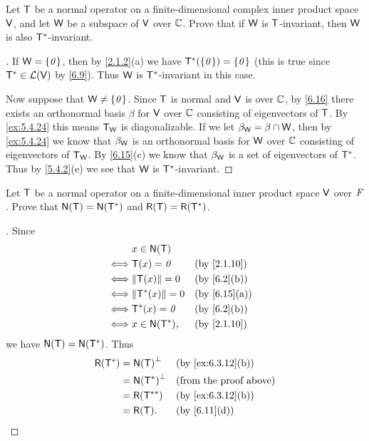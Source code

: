 \begin{ex}\label{ex:6.4.8}
  Let \(\mathsf{T}\) be a normal operator on a finite-dimensional complex inner product space \(\mathsf{V}\), and let \(\mathsf{W}\) be a subspace of \(\mathsf{V}\) over \(\mathbb{C}\).
  Prove that if \(\mathsf{W}\) is \(\mathsf{T}\)-invariant, then \(\mathsf{W}\) is also \(\mathsf{T}^*\)-invariant.
\end{ex}

\begin{proof}[]
  If \(\mathsf{W} = \left\lbrace\mathit{0}\right\rbrace\), then by \cref{2.1.2}(a) we have \(\mathsf{T}^*(\left\lbrace\mathit{0}\right\rbrace) = \left\lbrace\mathit{0}\right\rbrace\) (this is true since \(\mathsf{T}^* \in \mathcal{L}(\mathsf{V})\) by \cref{6.9}).
  Thus \(\mathsf{W}\) is \(\mathsf{T}^*\)-invariant in this case.

  Now suppose that \(\mathsf{W} \neq \left\lbrace\mathit{0}\right\rbrace\).
  Since \(\mathsf{T}\) is normal and \(\mathsf{V}\) is over \(\mathbb{C}\), by \cref{6.16} there exists an orthonormal basis \(\beta\) for \(\mathsf{V}\) over \(\mathbb{C}\) consisting of eigenvectors of \(\mathsf{T}\).
  By \cref{ex:5.4.24} this means \(\mathsf{T}_{\mathsf{W}}\) is diagonalizable.
  If we let \(\beta_{\mathsf{W}} = \beta \cap \mathsf{W}\), then by \cref{ex:5.4.24} we know that \(\beta_{\mathsf{W}}\) is an orthonormal basis for \(\mathsf{W}\) over \(\mathbb{C}\) consisting of eigenvectors of \(\mathsf{T}_{\mathsf{W}}\).
  By \cref{6.15}(c) we know that \(\beta_{\mathsf{W}}\) is a set of eigenvectors of \(\mathsf{T}^*\).
  Thus by \cref{5.4.2}(e) we see that \(\mathsf{W}\) is \(\mathsf{T}^*\)-invariant.
\end{proof}

\begin{ex}\label{ex:6.4.9}
  Let \(\mathsf{T}\) be a normal operator on a finite-dimensional inner product space \(\mathsf{V}\) over \(\mathit{F}\).
  Prove that \(\ns{\T} = \ns{\T^*}\) and \(\rg{\T} = \rg{\T^*}\).
\end{ex}

\begin{proof}[]
  Since
  \begin{align*}
         & x \in \ns{\T}                                      \\
    \iff & \T(x) = \zv        &  & \text{(by \cref{2.1.10})}  \\
    \iff & \norm{\T(x)} = 0   &  & \text{(by \cref{6.2}(b))}  \\
    \iff & \norm{\T^*(x)} = 0 &  & \text{(by \cref{6.15}(a))} \\
    \iff & \T^*(x) = \zv      &  & \text{(by \cref{6.2}(b))}  \\
    \iff & x \in \ns{\T^*},   &  & \text{(by \cref{2.1.10})}
  \end{align*}
  we have \(\ns{\T} = \ns{\T^*}\).
  Thus
  \begin{align*}
    \rg{\T^*} & = \ns{\T}^{\perp}   &  & \text{(by \cref{ex:6.3.12}(b))} \\
              & = \ns{\T^*}^{\perp} &  & \text{(from the proof above)}   \\
              & = \rg{\T^{**}}      &  & \text{(by \cref{ex:6.3.12}(b))} \\
              & = \rg{\T}.          &  & \text{(by \cref{6.11}(d))}
  \end{align*}
\end{proof}

